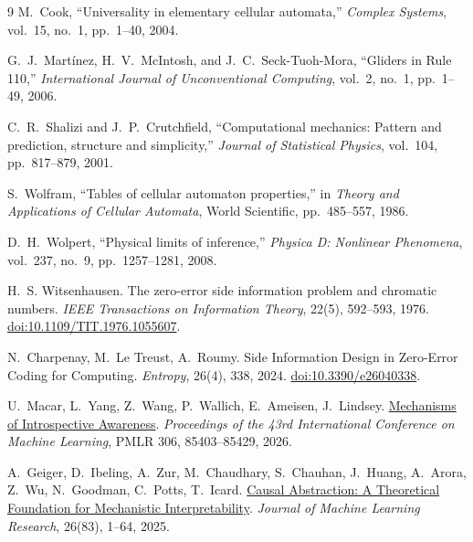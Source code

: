 \documentclass[11pt,a4paper]{article}
\DeclareRobustCommand{\textenglish}[1]{\foreignlanguage{english}{#1}}
\theoremstyle{definition}
\begin{document}
\begin{thebibliography}{9}
\textenglish{M.~Cook, ``Universality in elementary cellular automata,'' \emph{Complex Systems}, vol.~15, no.~1, pp.~1--40, 2004.}

\textenglish{G.~J.~Mart\'inez, H.~V.~McIntosh, and J.~C.~Seck-Tuoh-Mora, ``Gliders in Rule 110,'' \emph{International Journal of Unconventional Computing}, vol.~2, no.~1, pp.~1--49, 2006.}

\textenglish{C.~R.~Shalizi and J.~P.~Crutchfield, ``Computational mechanics: Pattern and prediction, structure and simplicity,'' \emph{Journal of Statistical Physics}, vol.~104, pp.~817--879, 2001.}

\textenglish{S.~Wolfram, ``Tables of cellular automaton properties,'' in \emph{Theory and Applications of Cellular Automata}, World Scientific, pp.~485--557, 1986.}

\textenglish{D.~H.~Wolpert, ``Physical limits of inference,'' \emph{Physica D: Nonlinear Phenomena}, vol.~237, no.~9, pp.~1257--1281, 2008.}

\textenglish{H.~S. Witsenhausen. The zero-error side information problem and chromatic numbers.
\emph{IEEE Transactions on Information Theory}, 22(5), 592--593, 1976.
\href{https://doi.org/10.1109/TIT.1976.1055607}{doi:10.1109/TIT.1976.1055607}.}

\textenglish{N.~Charpenay, M.~Le Treust, A.~Roumy. Side Information Design in Zero-Error Coding for Computing.
\emph{Entropy}, 26(4), 338, 2024.
\href{https://doi.org/10.3390/e26040338}{doi:10.3390/e26040338}.}

\textenglish{U.~Macar, L.~Yang, Z.~Wang, P.~Wallich, E.~Ameisen, J.~Lindsey.
\href{https://proceedings.mlr.press/v306/macar26a.html}{Mechanisms of Introspective Awareness}.
\emph{Proceedings of the 43rd International Conference on Machine Learning}, PMLR 306, 85403--85429, 2026.}

\textenglish{A.~Geiger, D.~Ibeling, A.~Zur, M.~Chaudhary, S.~Chauhan, J.~Huang, A.~Arora, Z.~Wu, N.~Goodman, C.~Potts, T.~Icard.
\href{https://www.jmlr.org/papers/v26/23-0058.html}{Causal Abstraction: A Theoretical Foundation for Mechanistic Interpretability}.
\emph{Journal of Machine Learning Research}, 26(83), 1--64, 2025.}

\end{thebibliography}
\endgroup
\end{document}
